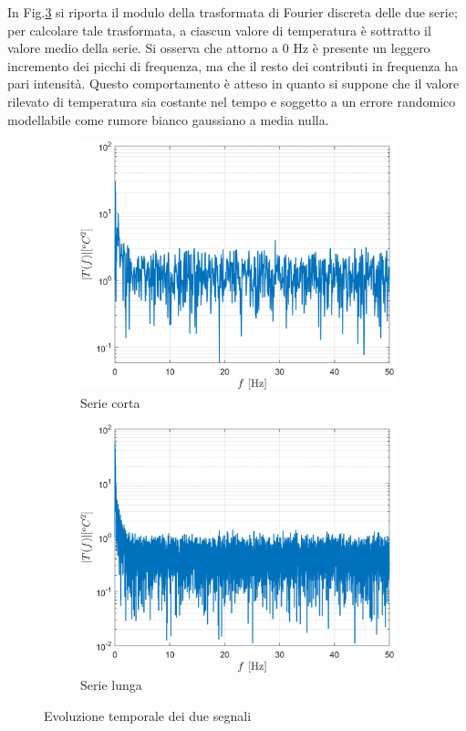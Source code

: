 In Fig.\ref{fig:ftboth} si riporta il modulo della trasformata di Fourier discreta delle due serie; per calcolare tale trasformata, a ciascun valore di temperatura è sottratto il valore medio della serie. 
Si osserva che attorno a 0 Hz è presente un leggero incremento dei picchi di frequenza, ma che il resto dei contributi in frequenza ha pari intensità. 
Questo comportamento è atteso in quanto si suppone che il valore rilevato di temperatura sia costante nel tempo e soggetto a un errore randomico modellabile come rumore bianco gaussiano a media nulla. 
\begin{figure}[H]
	\centering
	\begin{subfigure}{0.5\textwidth}
		\centering
		\includegraphics[width=0.95\linewidth]{"../sperimentazione nei propulsori/magplot_short"}
		\caption{Serie corta}
		\label{fig:ftshort}
	\end{subfigure}%
	\begin{subfigure}{0.5\textwidth}
		\centering
		\includegraphics[width=0.95\linewidth]{"../sperimentazione nei propulsori/magplot_long"}
		\caption{Serie lunga}
		\label{fig:ftlong}
	\end{subfigure}
	\caption{Evoluzione temporale dei due segnali}
	\label{fig:ftboth}
\end{figure}

